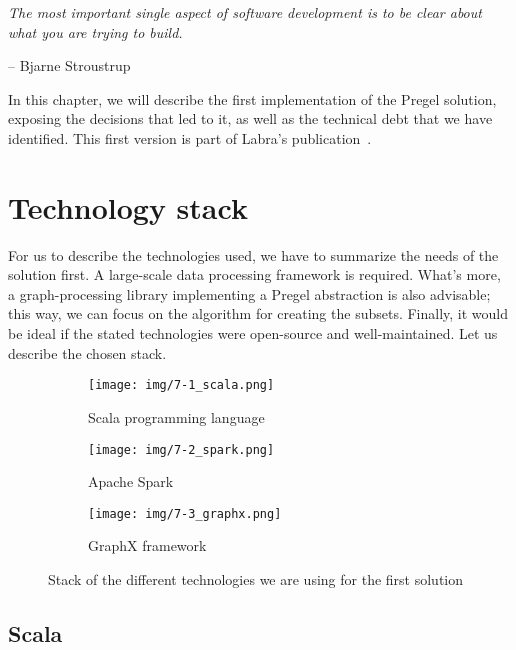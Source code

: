\epigraph{\textit{The most important single aspect of software development is to be clear about what you are trying to build.}}{-- \textup{Bjarne Stroustrup}}

In this chapter, we will describe the first implementation of the Pregel solution, exposing the decisions that led to it, as well as the technical debt that we have identified. This first version is part of Labra's publication~\cite{https://doi.org/10.48550/arxiv.2110.11709}.

\section{Technology stack}

For us to describe the technologies used, we have to summarize the needs of the solution first. A large-scale data processing framework is required. What's more, a graph-processing library implementing a Pregel abstraction is also advisable; this way, we can focus on the algorithm for creating the subsets. Finally, it would be ideal if the stated technologies were open-source and well-maintained. Let us describe the chosen stack.

\begin{figure}[ht]
    \begin{subfigure}{.3\textwidth}
        \centering
        \texttt{[image: img/7-1\_scala.png]}
        \caption{Scala programming language}
    \end{subfigure}%
    \hspace*{0.5em}
    \begin{subfigure}{.3\textwidth}
        \centering
        \texttt{[image: img/7-2\_spark.png]}
        \caption{Apache Spark}
    \end{subfigure}%
    \hspace*{0.5em}
    \begin{subfigure}{.3\textwidth}
        \centering
        \texttt{[image: img/7-3\_graphx.png]}
        \caption{GraphX framework}
    \end{subfigure}%
    \caption{Stack of the different technologies we are using for the first solution}
\end{figure}

\subsection{Scala}


